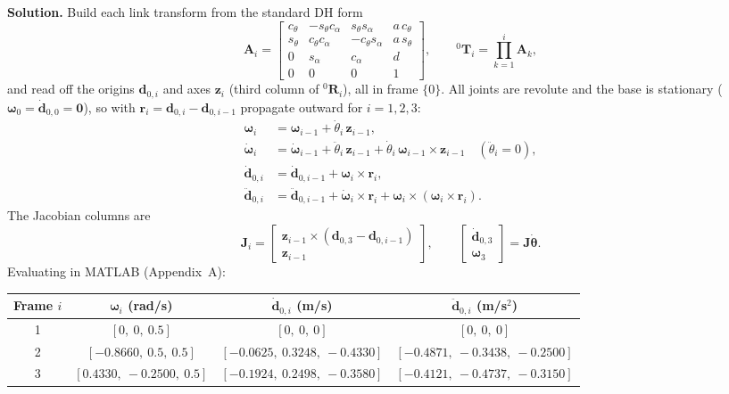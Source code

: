\documentclass[11pt]{article}
\newcommand{\T}{\bm{T}}
\newcommand{\R}{\bm{R}}
\newcommand{\dvec}{\bm{d}}
\newcommand{\framen}[1]{\{#1\}}
\newcommand{\wvec}{\bm{\omega}}
\begin{document}
\textbf{Solution.} Build each link transform from the standard DH form
\[
\bm{A}_i=\begin{bmatrix}
c_{\theta}&-s_{\theta}c_{\alpha}&s_{\theta}s_{\alpha}&a\,c_{\theta}\\
s_{\theta}&c_{\theta}c_{\alpha}&-c_{\theta}s_{\alpha}&a\,s_{\theta}\\
0&s_{\alpha}&c_{\alpha}&d\\
0&0&0&1
\end{bmatrix},\qquad
{}^0\T_i=\prod_{k=1}^{i}\bm{A}_k,
\]
and read off the origins $\dvec_{0,i}$ and axes $\bm{z}_i$ (third column of ${}^0\R_i$), all in frame $\framen{0}$. All joints are revolute and the base is stationary ($\wvec_0=\dot{\dvec}_{0,0}=\bm{0}$), so with $\bm{r}_i=\dvec_{0,i}-\dvec_{0,i-1}$ propagate outward for $i=1,2,3$:
\begin{align*}
\wvec_i&=\wvec_{i-1}+\dot\theta_i\,\bm{z}_{i-1},\\
\dot{\wvec}_i&=\dot{\wvec}_{i-1}+\ddot\theta_i\,\bm{z}_{i-1}+\dot\theta_i\,\wvec_{i-1}\times\bm{z}_{i-1}\quad(\ddot\theta_i=0),\\
\dot{\dvec}_{0,i}&=\dot{\dvec}_{0,i-1}+\wvec_i\times\bm{r}_i,\\
\ddot{\dvec}_{0,i}&=\ddot{\dvec}_{0,i-1}+\dot{\wvec}_i\times\bm{r}_i+\wvec_i\times(\wvec_i\times\bm{r}_i).
\end{align*}
The Jacobian columns are
\[
\bm{J}_i=\begin{bmatrix}\bm{z}_{i-1}\times(\dvec_{0,3}-\dvec_{0,i-1})\\ \bm{z}_{i-1}\end{bmatrix},\qquad
\begin{bmatrix}\dot{\dvec}_{0,3}\\ \wvec_3\end{bmatrix}=\bm{J}\dot{\bm{\theta}}.
\]
Evaluating in MATLAB (Appendix~A):
\begin{center}
\small
\begin{tabular}{c|ccc}
Frame $i$ & $\wvec_i$ (rad/s) & $\dot{\dvec}_{0,i}$ (m/s) & $\ddot{\dvec}_{0,i}$ (m/s$^2$) \\ \hline
1 & $[0,\ 0,\ 0.5]$ & $[0,\ 0,\ 0]$ & $[0,\ 0,\ 0]$ \\
2 & $[-0.8660,\ 0.5,\ 0.5]$ & $[-0.0625,\ 0.3248,\ -0.4330]$ & $[-0.4871,\ -0.3438,\ -0.2500]$ \\
3 & $[0.4330,\ -0.2500,\ 0.5]$ & $[-0.1924,\ 0.2498,\ -0.3580]$ & $[-0.4121,\ -0.4737,\ -0.3150]$
\end{tabular}
\end{center}
\end{document}

